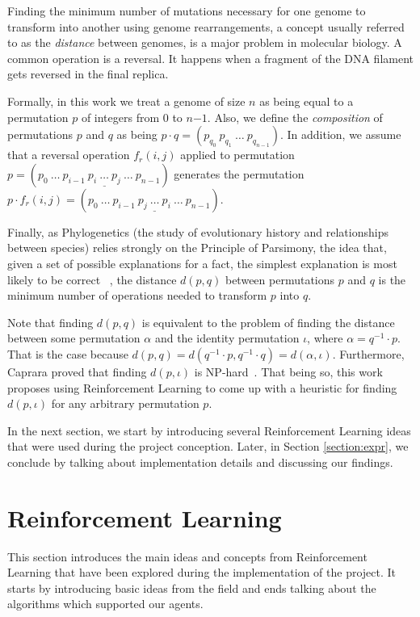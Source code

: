 \documentclass[11pt,twoside]{article}
\begin{document}
Finding the minimum number of mutations necessary for one genome to transform into another using genome rearrangements, a concept usually referred to as the \textit{distance} between genomes, is a major problem in molecular biology. A common operation is a reversal. It happens when a fragment of the DNA filament gets reversed in the final replica. 

Formally, in this work we treat a genome of size $n$ as being equal to a permutation $p$ of integers from $0$ to $n{-1}$. Also, we define the \textit{composition} of permutations $p$ and $q$ as being $p \cdot q = (p_{q_0}\ p_{q_1}\ \ldots\ p_{q_{n-1}})$. In addition, we assume that a reversal operation $f_r(i,j)$ applied to permutation $p = (p_0\ \ldots\ p_{i-1}\ \underline{p_{i}\ \ldots\ p_{j}}\ \ldots\ p_{n-1})$ generates the permutation $p \cdot f_r(i,j) = (p_0\ \ldots\ p_{i-1}\ \underline{p_{j}\ \ldots\ p_{i}}\ \ldots\ p_{n-1})$.

Finally, as Phylogenetics (the study of evolutionary history and relationships between species) relies strongly on the Principle of Parsimony, the idea that, given a set of possible explanations for a fact, the simplest explanation is most likely to be correct ~\cite{parsimony}, the distance $d(p, q)$ between permutations $p$ and $q$ is the minimum number of operations needed to transform $p$ into $q$. 

Note that finding $d(p, q)$ is equivalent to the problem of finding the distance between some permutation $\alpha$ and the identity permutation $\iota$, where $\alpha = q^{-1} \cdot p$. That is the case because $d(p, q) = d(q^{-1} \cdot p, q^{-1} \cdot q) = d(\alpha, \iota)$. Furthermore, Caprara proved that finding $d(p, \iota)$ is NP-hard~\cite{caprara1999sorting}. That being so, this work proposes using Reinforcement Learning to come up with a heuristic for finding $d(p, \iota)$ for any arbitrary permutation $p$.

In the next section, we start by introducing several Reinforcement Learning ideas that were used during the project conception. Later, in Section \ref{section:expr}, we conclude by talking about implementation details and discussing our findings.

\section{Reinforcement Learning}

This section introduces the main ideas and concepts from Reinforcement Learning that have been explored during the implementation of the project. It starts by introducing basic ideas from the field and ends talking about the algorithms which supported our agents.
\end{document}
